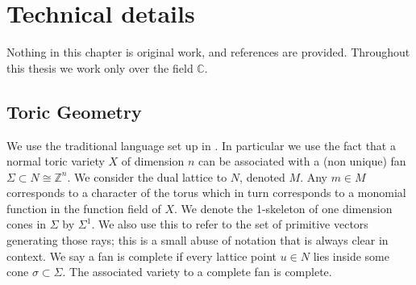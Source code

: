 \documentclass[12pt,a4paper]{book}      %
\newtheorem{thm}{Theorem}[section]
\theoremstyle{definition}
\newcommand{\mb}[1]{\mathbb{#1}}
\begin{document}
\begin{comment}
\subsection{Smoothings of log extremal extractions}

To fit with the ongoing interest in toric degenerations, we study the case of a log terminal cyclic extractions from a given singularity. These are maps $f: \: Y \rightarrow X$ with relative Picard rank one, such that both $X$ and $Y$ only have cyclic quotient singularities along with other technical conditions. we prove the following:

\begin{thm}
Let  $f: \: Y \rightarrow X$ be a cyclic extraction in dimension two then both $Y$ admits a toric degeneration which $Y_\Sigma$ which extends map $f$ to $f_\Sigma : \: Y \rightarrow X$
\end{thm}
We then characterise these possible toric degenerations, and extend this in part to higher dimension. We also provide several examples of how this can be applied to the global case. In addition in dimension greater than or equal to three we discuss how this gives explicit equations for every single possible deformation of the toric variety. In addition we show how this relates with notion of focus-focus singularities and the SYZ fibration in dimension 2.
\end{comment}


\chapter{Technical details}


\setcounter{chapter}{2}
Nothing in this chapter is original work, and references are provided. Throughout this thesis we work only over the field $\mb{C}$.
\section{Toric Geometry}

We use the traditional language set up in \cite{cox}. In particular we use the fact that a normal toric variety $X$ of dimension $n$ can be associated with a (non unique) fan $\Sigma \subset N \cong \mb{Z}^n$. We consider the dual lattice to $N$, denoted $M$. Any $m \in M$ corresponds to a character of the torus which in turn corresponds to a monomial function in the function field of $X$. We denote the 1-skeleton of one dimension cones in $\Sigma$ by $\Sigma^1$. We also use this to refer to the set of primitive vectors generating those rays; this is a small abuse of notation that is always clear in context. We say a fan is complete if every lattice point $u \in N$ lies inside some cone $\sigma \subset \Sigma$. The associated variety to a complete fan is complete.
\end{document}
